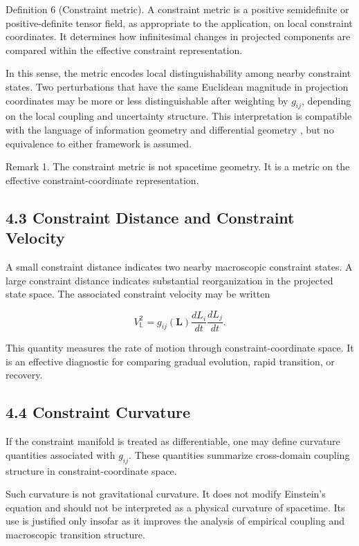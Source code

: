 \documentclass[aps,pre,reprint,superscriptaddress,nofootinbib]{revtex4-2}
\begin{document}
Definition 6 (Constraint metric). A constraint metric is a positive semidefinite or positive-definite tensor field, as appropriate to the application, on local constraint coordinates. It determines how infinitesimal changes in projected components are compared within the effective constraint representation.

In this sense, the metric encodes local distinguishability among nearby constraint states. Two perturbations that have the same Euclidean magnitude in projection coordinates may be more or less distinguishable after weighting by \(g_{ij}\), depending on the local coupling and uncertainty structure. This interpretation is compatible with the language of information geometry \cite{AmariNagaoka2000,Rao1945} and differential geometry \cite{Lee2012Smooth,Lee1997Riemannian}, but no equivalence to either framework is assumed.

Remark 1. The constraint metric is not spacetime geometry. It is a metric on the effective constraint-coordinate representation.

\subsection{4.3 Constraint Distance and Constraint Velocity}

A small constraint distance indicates two nearby macroscopic constraint states. A large constraint distance indicates substantial reorganization in the projected state space. The associated constraint velocity may be written

\[ V_{\mathbb{L}}^2=g_{ij}(\mathbf{L})\frac{dL_i}{dt}\frac{dL_j}{dt}. \]

This quantity measures the rate of motion through constraint-coordinate space. It is an effective diagnostic for comparing gradual evolution, rapid transition, or recovery.

\subsection{4.4 Constraint Curvature}

If the constraint manifold is treated as differentiable, one may define curvature quantities associated with \(g_{ij}\). These quantities summarize cross-domain coupling structure in constraint-coordinate space.

Such curvature is not gravitational curvature. It does not modify Einstein's equation and should not be interpreted as a physical curvature of spacetime. Its use is justified only insofar as it improves the analysis of empirical coupling and macroscopic transition structure.
\end{document}
